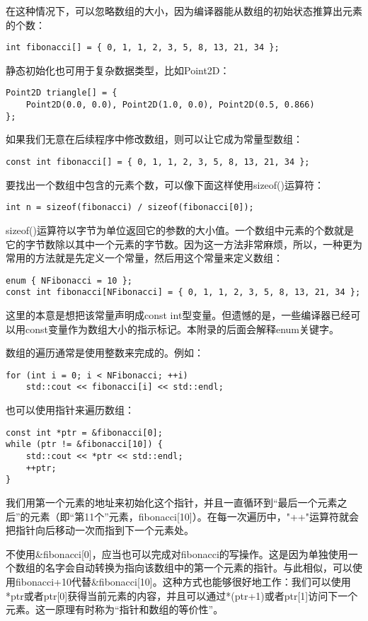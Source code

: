 \documentclass[11pt,oneside]{book}
\begin{document}
\begin{common-format}
在这种情况下，可以忽略数组的大小，因为编译器能从数组的初始状态推算出元素的个数：
\begin{Verbatim}
int fibonacci[] = { 0, 1, 1, 2, 3, 5, 8, 13, 21, 34 };
\end{Verbatim}

静态初始化也可用于复杂数据类型，比如Point2D：
\begin{Verbatim}
Point2D triangle[] = {
    Point2D(0.0, 0.0), Point2D(1.0, 0.0), Point2D(0.5, 0.866)
};
\end{Verbatim}

如果我们无意在后续程序中修改数组，则可以让它成为常量型数组：
\begin{Verbatim}
const int fibonacci[] = { 0, 1, 1, 2, 3, 5, 8, 13, 21, 34 };
\end{Verbatim}

要找出一个数组中包含的元素个数，可以像下面这样使用sizeof()运算符：
\begin{Verbatim}
int n = sizeof(fibonacci) / sizeof(fibonacci[0]);
\end{Verbatim}

sizeof()运算符以字节为单位返回它的参数的大小值。一个数组中元素的个数就是它的字节数除以其中一个元素的字节数。因为这一方法非常麻烦，所以，一种更为常用的方法就是先定义一个常量，然后用这个常量来定义数组：
\begin{Verbatim}
enum { NFibonacci = 10 };
const int fibonacci[NFibonacci] = { 0, 1, 1, 2, 3, 5, 8, 13, 21, 34 };
\end{Verbatim}

这里的本意是想把该常量声明成const int型变量。但遗憾的是，一些编译器已经可以用const变量作为数组大小的指示标记。本附录的后面会解释enum关键字。

数组的遍历通常是使用整数来完成的。例如：
\begin{Verbatim}
for (int i = 0; i < NFibonacci; ++i)
    std::cout << fibonacci[i] << std::endl;
\end{Verbatim}

也可以使用指针来遍历数组：
\begin{Verbatim}
const int *ptr = &fibonacci[0];
while (ptr != &fibonacci[10]) {
    std::cout << *ptr << std::endl;
    ++ptr;
}
\end{Verbatim}

我们用第一个元素的地址来初始化这个指针，并且一直循环到“最后一个元素之后”的元素（即“第11个”元素，fibonacci[10]）。在每一次遍历中，"++"运算符就会把指针向后移动一次而指到下一个元素处。

不使用\&{}fibonacci[0]，应当也可以完成对fibonacci的写操作。这是因为单独使用一个数组的名字会自动转换为指向该数组中的第一个元素的指针。与此相似，可以使用fibonacci+10代替\&{}fibonacci[10]。这种方式也能够很好地工作：我们可以使用*ptr或者ptr[0]获得当前元素的内容，并且可以通过*(ptr+1)或者ptr[1]访问下一个元素。这一原理有时称为“指针和数组的等价性”。


\end{common-format}
\end{document}
